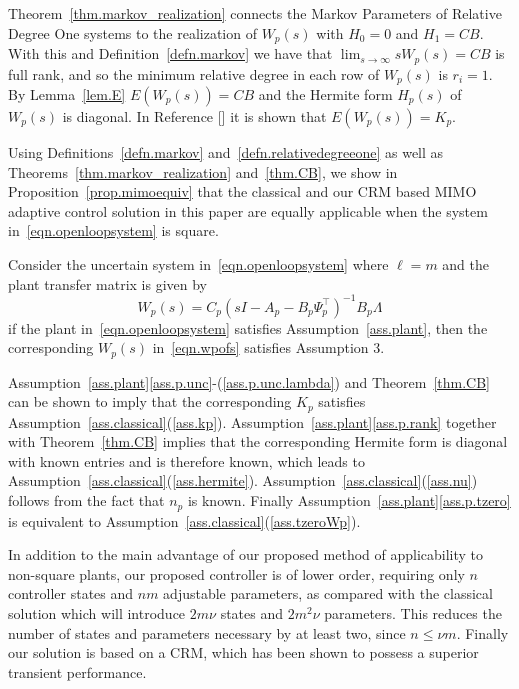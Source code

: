 \documentclass[]{../sty/aiaa-tc}
\begin{document}
  \begin{proof-dan}
    Theorem~\ref{thm.markov_realization} connects the Markov Parameters of Relative Degree One systems to the realization of $W_{p}(s)$ with $H_{0}=0$ and $H_{1}=CB$.
    With this and Definition~\ref{defn.markov} we have that $\lim_{s\rightarrow\infty}sW_{p}(s)=CB$ is full rank, and so the minimum relative degree in each row of $W_{p}(s)$ is $r_{i}=1$.
    By Lemma~\ref{lem.E} $E(W_{p}(s))=CB$ and the Hermite form $H_{p}(s)$ of $W_{p}(s)$ is diagonal.
    In Reference [] it is shown that $E(W_{p}(s))=K_{p}$.
  \end{proof-dan}

  Using Definitions~\ref{defn.markov} and~\ref{defn.relativedegreeone} as well as Theorems~\ref{thm.markov_realization} and~\ref{thm.CB}, we show in Proposition~\ref{prop.mimoequiv} that the classical and our CRM based MIMO adaptive control solution in this paper are equally applicable when the system in\ \eqref{eqn.openloopsystem} is square.

  \begin{prop-dan}\label{prop.mimoequiv}
    Consider the uncertain system in\ \eqref{eqn.openloopsystem} where $\ell=m$ and the plant transfer matrix is given by
    \begin{equation}
      \label{eqn.wpofs}
      W_{p}(s)=C_{p}(sI-A_{p}-B_{p}\Psi_{p}^{\top})^{-1}B_{p}\Lambda
    \end{equation}
    if the plant in\ \eqref{eqn.openloopsystem} satisfies Assumption~\ref{ass.plant}, then the corresponding $W_p(s)$ in\ \eqref{eqn.wpofs} satisfies Assumption 3.
  \end{prop-dan}

  \begin{proof-dan}
    Assumption~\ref{ass.plant}\ref{ass.p.unc}-(\ref{ass.p.unc.lambda}) and Theorem~\ref{thm.CB} can be shown to imply that the corresponding $K_p$ satisfies Assumption~\ref{ass.classical}(\ref{ass.kp}).
    Assumption~\ref{ass.plant}\ref{ass.p.rank} together with Theorem~\ref{thm.CB} implies that the corresponding Hermite form is diagonal with known entries and is therefore known, which leads to Assumption~\ref{ass.classical}(\ref{ass.hermite}).
    Assumption~\ref{ass.classical}(\ref{ass.nu}) follows from the fact that $n_{p}$ is known.
    Finally Assumption~\ref{ass.plant}\ref{ass.p.tzero} is equivalent to Assumption~\ref{ass.classical}(\ref{ass.tzeroWp}).
  \end{proof-dan}

  In addition to the main advantage of our proposed method of applicability to non-square plants, our proposed controller is of lower order, requiring only $n$ controller states and $nm$ adjustable parameters, as compared with the classical solution which will introduce $2m\nu$ states and $2m^{2}\nu$ parameters.
  This reduces the number of states and parameters necessary by at least two, since $n\leq\nu m$\cite{chen.linear.1999}.
  Finally our solution is based on a CRM, which has been shown to possess a superior transient performance\cite{gibson.aiaacrm.2012,gibson.ecc.2013,gibson.ieeeaccess.2013,gibson.acc.2013}.
\end{document}
